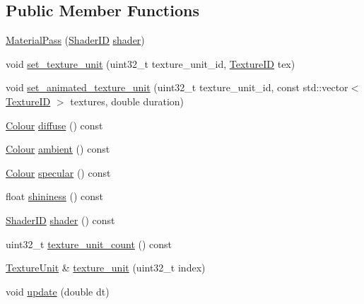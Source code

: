 \subsection*{Public Member Functions}
\begin{DoxyCompactItemize}
\item 
\hyperlink{classkglt_1_1_material_pass_a2961c9fc4fc8dc4a88fb88e001a7c710}{Material\-Pass} (\hyperlink{namespacekglt_a2aafe4bf33d26659020117cad360422f}{Shader\-I\-D} \hyperlink{classkglt_1_1_material_pass_ad740603f0820d75f0103f0a9388e14c3}{shader})
\item 
void \hyperlink{classkglt_1_1_material_pass_a4012915a59a46dd8e6d9e236736db43f}{set\-\_\-texture\-\_\-unit} (uint32\-\_\-t texture\-\_\-unit\-\_\-id, \hyperlink{namespacekglt_aaea040f25edb7f75ca0f3aa8136a45a1}{Texture\-I\-D} tex)
\item 
void \hyperlink{classkglt_1_1_material_pass_afe6270c470a69548fc779ed372e261a8}{set\-\_\-animated\-\_\-texture\-\_\-unit} (uint32\-\_\-t texture\-\_\-unit\-\_\-id, const std\-::vector$<$ \hyperlink{namespacekglt_aaea040f25edb7f75ca0f3aa8136a45a1}{Texture\-I\-D} $>$ textures, double duration)
\item 
\hyperlink{structkglt_1_1_colour}{Colour} \hyperlink{classkglt_1_1_material_pass_a4a7b53802594a603961f9f99cfd18421}{diffuse} () const 
\item 
\hyperlink{structkglt_1_1_colour}{Colour} \hyperlink{classkglt_1_1_material_pass_aadbe72523b0fde3ef6d7d40017f37b60}{ambient} () const 
\item 
\hyperlink{structkglt_1_1_colour}{Colour} \hyperlink{classkglt_1_1_material_pass_ace4b372efc2624e9dab4b07de70b6ddc}{specular} () const 
\item 
float \hyperlink{classkglt_1_1_material_pass_a9cf6e6395b0e6c378d494cbc9696be0a}{shininess} () const 
\item 
\hyperlink{namespacekglt_a2aafe4bf33d26659020117cad360422f}{Shader\-I\-D} \hyperlink{classkglt_1_1_material_pass_ad740603f0820d75f0103f0a9388e14c3}{shader} () const 
\item 
uint32\-\_\-t \hyperlink{classkglt_1_1_material_pass_a74485acbeae63d4715e2489fec37fb0e}{texture\-\_\-unit\-\_\-count} () const 
\item 
\hyperlink{classkglt_1_1_texture_unit}{Texture\-Unit} \& \hyperlink{classkglt_1_1_material_pass_a2a79b6e1316d16635f1aa07e5f8d1bdf}{texture\-\_\-unit} (uint32\-\_\-t index)
\item 
void \hyperlink{classkglt_1_1_material_pass_aab8c6590ca0cd932efc755c4dc2f58ca}{update} (double dt)

\end{DoxyCompactItemize}
